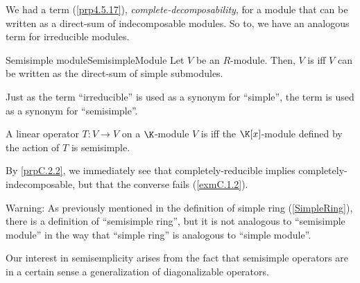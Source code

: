 We had a term (\cref{prp4.5.17}), \emph{complete-decomposability}, for a module that can be written as a direct-sum of indecomposable modules.  So to, we have an analogous term for irreducible modules.
\begin{dfn}{Semisimple module}{SemisimpleModule}
	Let $V$ be an $R$-module.  Then, $V$ is  iff $V$ can be written as the direct-sum of simple submodules.
	\begin{rmk}
		Just as the term ``irreducible'' is used as a synonym for ``simple'', the term  is used as a synonym for ``semisimple''.
	\end{rmk}
	\begin{rmk}
		A linear operator $T\colon V\rightarrow V$ on a $\K$-module $V$ is  iff the $\K [x]$-module defined by the action of $T$ is semisimple.
	\end{rmk}
	\begin{rmk}
		By \cref{prpC.2.2}, we immediately see that completely-reducible implies completely-indecomposable, but that the converse fails (\cref{exmC.1.2}).
	\end{rmk}
	\begin{rmk}
		Warning:  As previously mentioned in the definition of simple ring (\cref{SimpleRing}), there is a definition of ``semisimple ring'', but it is not analogous to ``semisimple module'' in the way that ``simple ring'' is analogous to ``simple module''.
	\end{rmk}
\end{dfn}
Our interest in semisemplicity arises from the fact that semisimple operators are in a certain sense a generalization of diagonalizable operators.